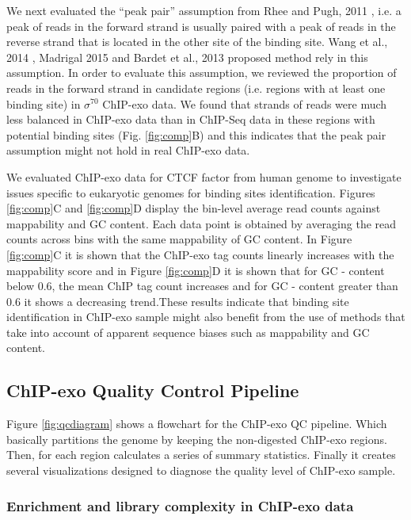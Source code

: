 \documentclass{bmcart}\usepackage[]{graphicx}\usepackage[]{color}
\newcommand{\sig}{\sigma^{70}}
\begin{document}
We next evaluated the ``peak pair'' assumption from Rhee and Pugh,
2011 \cite{exo1}, i.e. a peak of reads in the forward strand is
usually paired with a peak of reads in the reverse strand that is
located in the other site of the binding site. Wang et al., 2014
\cite{mace}, Madrigal 2015 \cite{cexor} and Bardet et al., 2013
\cite{peakzilla} proposed method rely in this assumption. In order to
evaluate this assumption, we reviewed the proportion of reads in the
forward strand in candidate regions (i.e. regions with at least one
binding site) in $\sig$ ChIP-exo data. We found that strands of reads
were much less balanced in ChIP-exo data than in ChIP-Seq data in
these regions with potential binding sites (Fig. \ref{fig:comp}B) and
this indicates that the peak pair assumption might not hold in real
ChIP-exo data.

We evaluated ChIP-exo data for CTCF factor from human genome
\cite{exo1} to investigate issues specific to eukaryotic genomes for
binding sites identification. Figures \ref{fig:comp}C and
\ref{fig:comp}D display the bin-level average read counts against
mappability and GC content. Each data point is obtained by averaging
the read counts across bins with the same mappability of GC
content. In Figure \ref{fig:comp}C it is shown that the ChIP-exo tag
counts linearly increases with the mappability score and in Figure
\ref{fig:comp}D it is shown that for GC - content below 0.6, the mean
ChIP tag count increases and for GC - content greater than 0.6 it
shows a decreasing trend.These results indicate that binding site
identification in ChIP-exo sample might also benefit from the use of
methods that take into account of apparent sequence biases such as
mappability and GC content.

\subsection{ChIP-exo Quality Control Pipeline}

Figure \ref{fig:qcdiagram} shows a flowchart for the ChIP-exo QC
pipeline. Which basically partitions the genome by keeping the
non-digested ChIP-exo regions. Then, for each region calculates a
series of summary statistics. Finally it creates several
visualizations designed to diagnose the quality level of ChIP-exo
sample.

\subsubsection{Enrichment and library complexity in ChIP-exo data}
\end{document}
